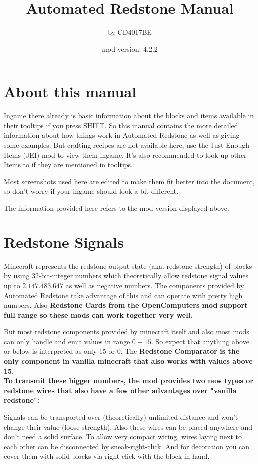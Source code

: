 \documentclass[11pt]{article} %
\title{Automated Redstone Manual}
\author{by CD4017BE}
\date{mod version: 4.2.2}
\begin{document}
 \maketitle
 \tableofcontents
 
 \section{About this manual}  
Ingame there already is basic information about the blocks and items available in their tooltips if you press SHIFT. So this manual contains the more detailed information about how things work in Automated Redstone as well as giving some examples. But crafting recipes are not available here, use the Just Enough Items (JEI) mod to view them ingame. It's also recommended to look up other Items to if they are mentioned in tooltips.

Most screenshots used here are edited to make them fit better into the document, so don't worry if your ingame should look a bit different. 

The information provided here refers to the mod version displayed above.

\section{Redstone Signals}
Minecraft represents the redstone output state (aka. redstone strength) of blocks by using 32-bit-integer numbers which theoretically allow redstone signal values up to $2.147.483.647$ as well as negative numbers. The components provided by Automated Redstone take advantage of this and can operate with pretty high numbers. Also \bf Redstone Cards \bf from the \bf OpenComputers \rm mod support full range so these mods can work together very well.

But most redstone components provided by minecraft itself and also most mods can only handle and emit values in range $0-15$. So expect that anything above or below is interpreted as only 15 or 0. The \bf Redstone Comparator \rm is the only component in vanilla minecraft that also works with values above 15.\\

To transmit these bigger numbers, the mod provides two new types or redstone wires that also have a few other advantages over "vanilla redstone":

Signals can be transported over (theoretically) unlimited distance and won't change their value (loose strength). Also these wires can be placed anywhere and don't need a solid surface.
To allow very compact wiring, wires laying next to each other can be disconnected by sneak-right-click. And for decoration you can cover them with solid blocks via right-click with the block in hand.
\end{document}
